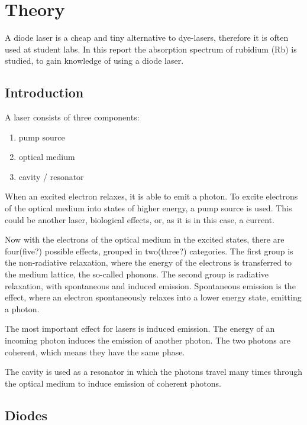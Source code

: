 \section{Theory}\label{theory}

A diode laser is a cheap and tiny alternative to dye-lasers, therefore it is often used at student
labs.
In this report the absorption spectrum of rubidium (Rb) is studied, to gain knowledge of using
a diode laser.

\subsection{Introduction}\label{introduction}

A laser consists of three components:

\begin{enumerate}
  \item pump source
  \item optical medium
  \item cavity / resonator
\end{enumerate}

When an excited electron relaxes, it is able to emit a photon.
To excite electrons of the optical medium into states of higher energy, a pump source is used.
This could be another laser, biological effects, or, as it is in this case, a current.

Now with the electrons of the optical medium in the excited states, there are four(five?) possible
effects, grouped in two(three?) categories.
The first group is the non-radiative relaxation, where the energy of the electrons is transferred
to the medium lattice, the so-called phonons.
The second group is radiative relaxation, with spontaneous and induced emission.
Spontaneous emission is the effect, where an electron spontaneously relaxes into a lower energy
state, emitting a photon.

The most important effect for lasers is induced emission.
The energy of an incoming photon induces the emission of another photon.
The two photons are coherent, which means they have the same phase.

The cavity is used as a resonator in which the photons travel many times through the optical medium
to induce emission of coherent photons.

\subsection{Diodes}\label{diodes}

